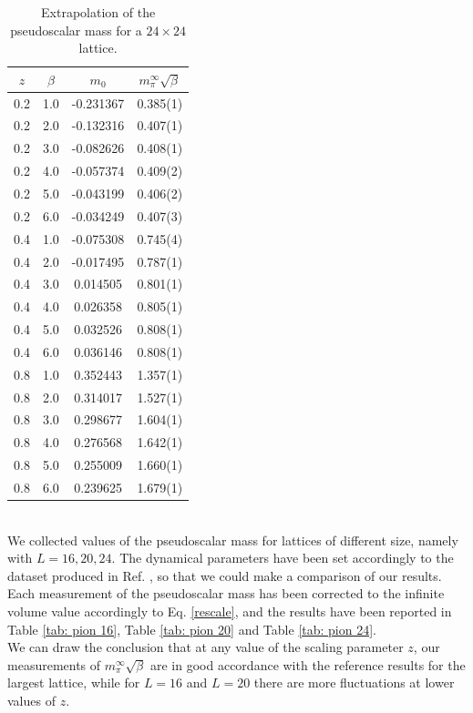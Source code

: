 \begin{table}
    \centering
    \begin{tabular}{c|c|c|c}
        $z$ & $\beta$ & $m_0$ & $m_{\pi}^{\infty}\sqrt{\beta}$  \\
        \hline \hline
        0.2 & 1.0 & -0.231367 & 0.385(1) \\
        0.2 & 2.0 & -0.132316 & 0.407(1) \\
        0.2 & 3.0 & -0.082626 & 0.408(1) \\
        0.2 & 4.0 & -0.057374 & 0.409(2) \\
        0.2 & 5.0 & -0.043199 & 0.406(2) \\
        0.2 & 6.0 & -0.034249 & 0.407(3) \\
        0.4 & 1.0 & -0.075308 & 0.745(4) \\
        0.4 & 2.0 & -0.017495 & 0.787(1) \\
        0.4 & 3.0 & 0.014505 & 0.801(1) \\
        0.4 & 4.0 & 0.026358 & 0.805(1) \\
        0.4 & 5.0 & 0.032526 & 0.808(1) \\
        0.4 & 6.0 & 0.036146 & 0.808(1) \\
        0.8 & 1.0 & 0.352443 & 1.357(1) \\
        0.8 & 2.0 & 0.314017 & 1.527(1) \\
        0.8 & 3.0 & 0.298677 & 1.604(1) \\
        0.8 & 4.0 & 0.276568 & 1.642(1) \\
        0.8 & 5.0 & 0.255009 & 1.660(1) \\
        0.8 & 6.0 & 0.239625 & 1.679(1) \\
    \end{tabular}
    \caption{Extrapolation of the pseudoscalar mass for a $24 \times 24$ lattice.}
    \label{tab: pion 24}
\end{table}
\\ We collected values of the pseudoscalar mass for lattices of different size, namely with $L = 16, 20, 24$. The dynamical parameters have been set accordingly to the dataset produced in Ref. \cite{Christian_2006}, so that we could make a comparison of our results. Each measurement of the pseudoscalar mass has been corrected to the infinite volume value accordingly to Eq. \eqref{rescale}, and the results have been reported in Table \eqref{tab: pion 16}, Table \eqref{tab: pion 20} and Table \eqref{tab: pion 24}.
\\ We can draw the conclusion that at any value of the scaling parameter $z$, our measurements of $m_\pi^{\infty}\sqrt{\beta}$ are in good accordance with the reference results for the largest lattice, while for $L = 16$ and $L = 20$ there are more fluctuations at lower values of $z$.
